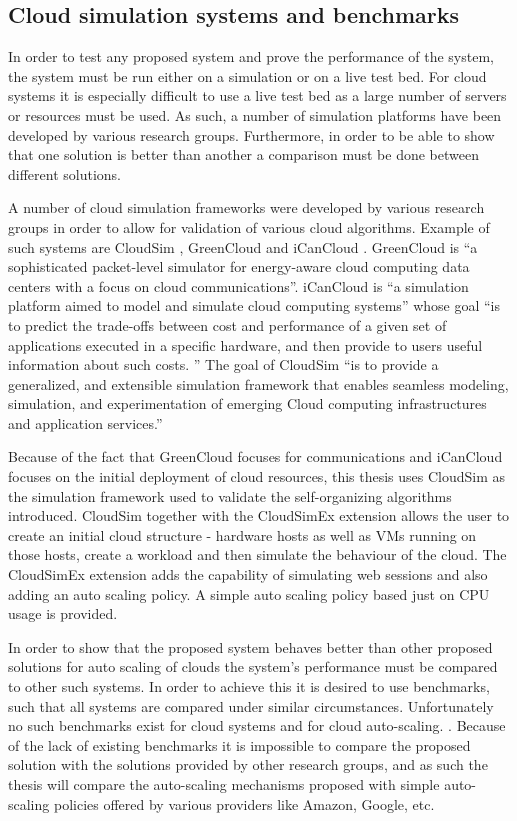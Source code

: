 \subsection{Cloud simulation systems and benchmarks}

In order to test any proposed system and prove the performance of the system, the system must be run either on a simulation or on a live test bed. For cloud systems it is especially difficult to use a live test bed as a large number of servers or resources must be used. As such, a number of simulation platforms have been developed by various research groups. Furthermore, in order to be able to show that one solution is better than another a comparison must be done between different solutions.

A number of cloud simulation frameworks were developed by various research groups in order to allow for validation of various cloud algorithms. Example of such systems are CloudSim \cite{related:cloudsim}, GreenCloud \cite{related:greencloud} and iCanCloud \cite{related:icancloud}. GreenCloud is ``a sophisticated packet-level simulator for energy-aware cloud computing data centers with a focus on cloud communications''. iCanCloud is ``a simulation platform aimed to model and simulate cloud computing systems'' whose goal ``is to predict the trade-offs between cost and performance of a given set of applications executed in a specific hardware, and then provide to users useful information about such costs. '' The goal of CloudSim ``is to provide a generalized, and extensible simulation framework that enables seamless modeling, simulation, and experimentation of emerging Cloud computing infrastructures and application services.''

Because of the fact that GreenCloud focuses for communications and iCanCloud focuses on the initial deployment of cloud resources, this thesis uses CloudSim as the simulation framework used to validate the self-organizing algorithms introduced. CloudSim together with the CloudSimEx extension allows the user to create an initial cloud structure - hardware hosts as well as VMs running on those hosts, create a workload and then simulate the behaviour of the cloud. The CloudSimEx extension adds the capability of simulating web sessions and also adding an auto scaling policy. A simple auto scaling policy based just on CPU usage is provided.

In order to show that the proposed system behaves better than other proposed solutions for auto scaling of clouds the system's performance must be compared to other such systems. In order to achieve this it is desired to use benchmarks, such that all systems are compared under similar circumstances. Unfortunately no such benchmarks exist for cloud systems and for cloud auto-scaling. \cite{related:cloudbench}. Because of the lack of existing benchmarks it is impossible to compare the proposed solution with the solutions provided by other research groups, and as such the thesis will compare the auto-scaling mechanisms proposed with simple auto-scaling policies offered by various providers like Amazon, Google, etc.


